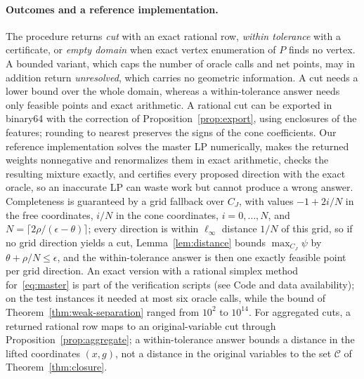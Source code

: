 \paragraph{Outcomes and a reference implementation.}
The procedure returns \emph{cut} with an exact rational row, \emph{within
tolerance} with a certificate, or \emph{empty domain} when exact vertex
enumeration of $P$ finds no vertex. A bounded variant, which caps the number
of oracle calls and net points, may in addition return \emph{unresolved},
which carries no geometric information. A cut needs a lower bound over the
whole domain, whereas a within-tolerance answer needs only feasible points
and exact arithmetic. A rational cut can be exported in binary64 with the
correction of Proposition~\ref{prop:export}, using enclosures of the
features; rounding to nearest preserves the signs of the cone coefficients.
Our reference implementation solves the master LP numerically, makes the
returned weights nonnegative and renormalizes them in exact arithmetic,
checks the resulting mixture exactly, and certifies every proposed direction
with the exact oracle, so an inaccurate LP can waste work but cannot produce
a wrong answer. Completeness is guaranteed by a grid fallback over $C_J$, with
values $-1+2i/N$ in the free coordinates, $i/N$ in the cone coordinates,
$i=0,\dots,N$, and $N=\lceil2\rho/(\epsilon-\theta)\rceil$; every direction is within
$\ell_\infty$ distance $1/N$ of this grid, so if no grid direction yields a cut,
Lemma~\ref{lem:distance} bounds $\max_{C_J}\psi$ by $\theta+\rho/N\le\epsilon$, and the
within-tolerance answer is then one exactly feasible point per grid direction.
An exact version with a rational simplex method for~\eqref{eq:master} is part
of the verification scripts (see Code and data availability); on the test
instances it needed at most six oracle calls, while the bound of
Theorem~\ref{thm:weak-separation} ranged from $10^2$ to $10^{14}$. For
aggregated cuts, a returned rational row maps to an original-variable cut
through Proposition~\ref{prop:aggregate}; a within-tolerance answer bounds a
distance in the lifted coordinates $(x,g)$, not a distance in the original
variables to the set $\mathcal C$ of Theorem~\ref{thm:closure}.

